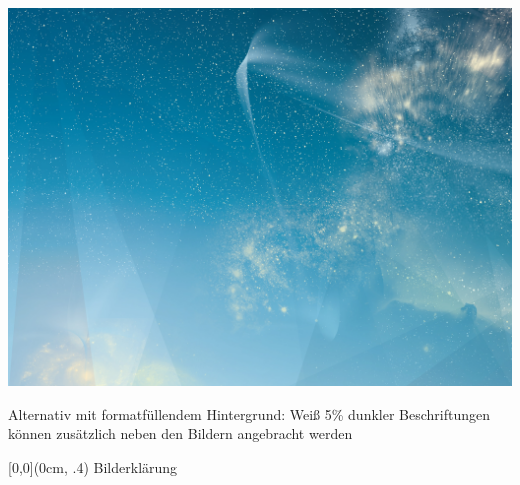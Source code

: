 \begin{frame}
\begin{frame}
\end{frame}
\clearpage


\begin{frame}

\begin{minipage}[t][0cm]{\paperwidth}%
\hspace*{-\PraesentationSeitenrand}%
\includegraphics[width=\textwidth]{./Resources/Images/SternenhimmelQuer.jpg}
\end{minipage}
    
\end{frame}
\clearpage

\begin{frame}
    
Alternativ mit formatfüllendem Hintergrund: Weiß 5\% dunkler\newline
Beschriftungen können zusätzlich neben den Bildern angebracht werden

\begin{textblock*}{\paperwidth}[0,0](0cm, .4\textheight)%
Bilderklärung
\end{textblock*}


\end{frame}
\end{frame}
